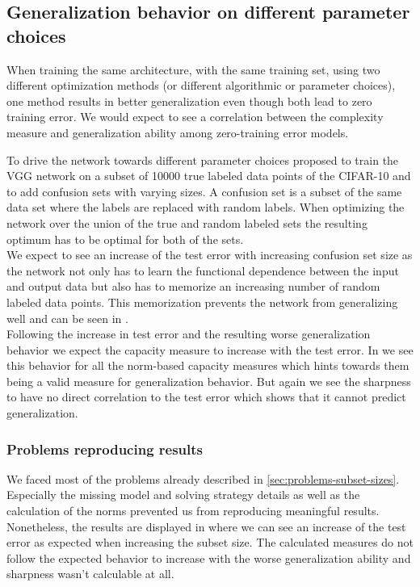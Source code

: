 \subsection{Generalization behavior on different parameter choices}
When training the same architecture, with the same training set, using two different optimization methods (or different algorithmic or parameter choices), one method results in better generalization even though both lead to zero training error. We would
expect to see a correlation between the complexity measure and generalization ability among zero-training error models. \cite{neyshabur2017exploring} \par
%
To drive the network towards different parameter choices \cite{neyshabur2017exploring} proposed to train the VGG network \cite{simonyan2014deep} on a subset of 10000 true labeled data points of the CIFAR-10  and to add confusion sets with varying sizes. A confusion set is a subset of the same data set where the labels are replaced with random labels. When optimizing the network over the union of the true and random labeled sets the resulting optimum has to be optimal for both of the sets.\\
%
We expect to see an increase of the test error with increasing confusion set size as the network not only has to learn the functional dependence between the input and output data but also has to memorize an increasing number of random labeled data points.
This memorization prevents the network from generalizing well and can be seen in .\\
%
Following the increase in test error and the resulting worse generalization behavior we expect the capacity measure to increase with the test error. In  we see this behavior for all the norm-based capacity measures which hints towards them being a valid measure for generalization behavior. But again we see the sharpness to have no direct correlation to the test error which shows that it cannot predict generalization.
%
\subsubsection{Problems reproducing results}
We faced most of the problems already described in \ref{sec:problems-subset-sizes}. Especially the missing model and solving strategy details as well as the calculation of the norms prevented us from reproducing meaningful results. Nonetheless, the results are displayed in  where we can see an increase of the test error as expected when increasing the subset size. The calculated measures do not follow the expected behavior to increase with the worse generalization ability and sharpness wasn't calculable at all.
%
